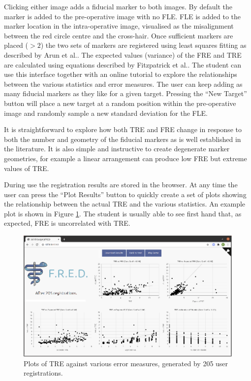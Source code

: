 Clicking either image adds a fiducial marker to both images. By default the marker is added to the pre-operative image 
with no \gls{FLE}. \gls{FLE} is added to the marker location in the intra-operative image, visualised as the misalignment
between the red circle centre and the cross-hair. Once sufficient markers are placed ($>2$) the two sets of markers are registered using least squares fitting as described by Arun et al.\cite{Arun1987}. The expected values (variance) of the \gls{FRE} and \gls{TRE} are calculated 
using equations described by Fitzpatrick et al.\cite{Fitzpatrick1998}. The student can use this interface together with an 
online tutorial 
to explore the relationships between the various statistics and error measures. The
user can keep adding as many fiducial markers as they like for a given target. 
Pressing the ``New Target'' button will place a new target at a random position 
within the pre-operative image and randomly sample a new standard deviation for the
\gls{FLE}.

It is straightforward to explore how both \gls{TRE} and \gls{FRE} change in response to 
both the number and geometry of the fiducial markers as is well established in the literature\cite{1295074, Fitzpatrick1998}. 
It is
also simple and instructive to create degenerate marker geometries, for example 
a linear arrangement can produce low \gls{FRE} but extreme values of \gls{TRE}.

During use the registration results are 
stored in the browser. At any time the user can press the ``Plot Results'' button to quickly create a set of 
plots showing the relationship between the actual \gls{TRE} and the various statistics. 
An example plot is shown in Figure \ref{fig:correlation}. 
The student is usually able to see first hand that, as expected, \gls{FRE} is uncorrelated with \gls{TRE}. 

\begin{figure}
	\begin{center}
	\includegraphics[width=0.9\linewidth]{images/default.eps}
		\caption{\label{fig:correlation}Plots of TRE against various error measures, generated by 
		205 user registrations.}
	\end{center}
\end{figure}

